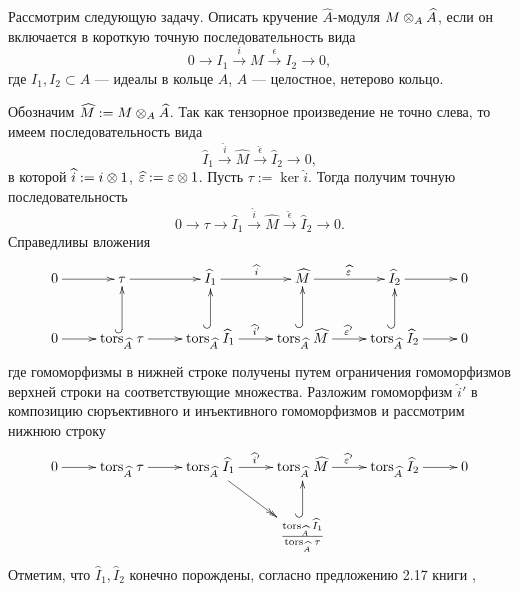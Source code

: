     Рассмотрим следующую задачу. Описать кручение $\hat A$-модуля $M \otimes_A \widehat{A}$, если 
    он включается в короткую точную последовательность вида
    \begin{equation*}
        0 \rightarrow I_1 \xrightarrow{i} M \xrightarrow{\epsilon} I_2 \rightarrow 0,
    \end{equation*}
    где $I_1, I_2 \subset A$ --- идеалы в кольце $A$, $A$ --- целостное, нетерово кольцо. 

    Обозначим $\widehat{M} := M \otimes_A \widehat{A}$. Так как тензорное произведение не точно слева, то
    имеем последовательность вида
    \begin{equation*}
        \hat I_1 \xrightarrow{\hat i} \hat M \xrightarrow{\hat \epsilon} \hat I_2 \rightarrow 0,
    \end{equation*}
    в которой $\widehat i := i \otimes 1$, $\widehat {\varepsilon} := \varepsilon \otimes 1$. Пусть $\tau := \ker \hat i$. Тогда
    получим точную последовательность 
    \begin{equation*}
        0 \rightarrow \tau \rightarrow \hat I_1 \xrightarrow{\hat i} \hat M \xrightarrow{\hat \epsilon} \hat I_2 \rightarrow 0.
    \end{equation*}
    Справедливы вложения
    $$   
        \xymatrix{
            0 \ar[r] 
            &\tau \ar[r] 
            &\hat I_1 \ar[r]^{\hat i} 
            &\hat M \ar[r]^{\hat \epsilon} 
            &\hat I_2 \ar[r] 
            &0\\
            0 \ar[r] 
            & \Tors{\hat A}{\tau} \ar[r] \ar@{^{(}->}[u]
            & \Tors{\hat A}{\hat I_1} \ar[r]^{\hat i'} \ar@{^{(}->}[u]
            & \Tors{\hat A}{\hat M} \ar[r]^{\hat \epsilon'} \ar@{^{(}->}[u]
            & \Tors{\hat A}{\hat I_2} \ar[r] \ar@{^{(}->}[u]
            &0
        }
    $$
    где гомоморфизмы в нижней строке получены путем ограничения гомоморфизмов верхней строки на соответствующие множества. 
    Разложим гомоморфизм $\hat i'$ в композицию сюръективного и инъективного гомоморфизмов и рассмотрим нижнюю строку
    $$   
        \xymatrix{
            0 \ar[r] 
            & \Tors{\hat A}{\tau} \ar[r] 
            & \Tors{\hat A}{\hat I_1} \ar[r]^{\hat i'} \ar@{>>}[rd]
            & \Tors{\hat A}{\hat M} \ar[r]^{\hat \epsilon'} 
            & \Tors{\hat A}{\hat I_2} \ar[r] 
            &0
            \\
            &
            &
            &\frac{\Tors{\hat A}{\hat I_1}}{\Tors{\hat A}{\tau}} \ar@{^{(}->}[u] 
        }
    $$
    Отметим, что $\hat I_1, \hat I_2$ конечно порождены, согласно предложению 2.17 книги \cite{A-M}, 
